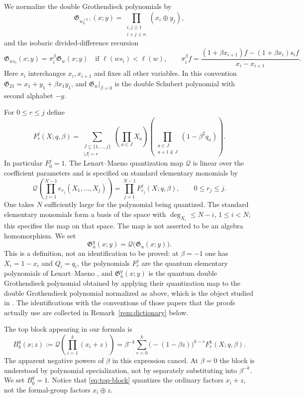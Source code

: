 \documentclass[11pt]{article}
\newcommand{\G}{\mathfrak{G}}
\newcommand{\Q}{\mathcal{Q}}
\newcommand{\ellength}{\ell}
\begin{document}
We normalize the double Grothendieck polynomials by
\[
 \G_{w_0^{(n)}}(x;y)
   =\prod_{\substack{i,j\geq 1\\i+j\leq n}}(x_i\oplus y_j),
\]
and the isobaric divided-difference recursion
\[
 \G_{ws_i}(x;y)=\pi_i^\beta\G_w(x;y)
 \quad\text{if }\ellength(ws_i)<\ellength(w),\qquad
 \pi_i^\beta f
 =\frac{(1+\beta x_{i+1})f-(1+\beta x_i)s_i f}
        {x_i-x_{i+1}}.
\]
Here $s_i$ interchanges $x_i,x_{i+1}$ and fixes all other variables.
In this convention $\G_{21}=x_1+y_1+\beta x_1y_1$, and
$\G_w|_{\beta=0}$ is the double Schubert polynomial with second
alphabet $-y$.

For $0\leq r\leq j$ define
\begin{equation}\label{eq:quantum-elementary}
 F_r^j(X;q,\beta)
 =\sum_{\substack{J\subseteq\{1,\ldots,j\}\\|J|=r}}
    \left(\prod_{a\in J}X_a\right)
    \left(\prod_{\substack{a\in J\\a+1\notin J}}
                     (1-\beta^2q_a)\right).
\end{equation}
In particular $F_0^j=1$.
The Lenart--Maeno quantization map $\Q$ is linear over the coefficient
parameters and is specified on standard elementary monomials by
\begin{equation}\label{eq:quantization}
 \Q\left(\prod_{j=1}^{N-1}e_{r_j}(X_1,\ldots,X_j)\right)
   =\prod_{j=1}^{N-1}F_{r_j}^j(X;q,\beta),
 \qquad 0\leq r_j\leq j.
\end{equation}
One takes $N$ sufficiently large for the polynomial being quantized.
The standard elementary monomials form a basis of the space with
$\deg_{X_i}\leq N-i$, $1\leq i<N$; this specifies the map on that
space. The map is not asserted to be an algebra homomorphism.
We set
\[
 \G_u^q(x;y)=\Q\bigl(\G_u(x;y)\bigr).
\]
This is a definition, not an identification to be proved: at
$\beta=-1$ one has $X_i=1-x_i$ and $Q_i=q_i$, the polynomials
$F^j_r$ are the quantum elementary polynomials of Lenart--Maeno
\cite{lenart2006quantum}, and $\G^q_u(x;y)$ is the quantum double
Grothendieck polynomial obtained by applying their quantization map to
the double Grothendieck polynomial normalized as above, which is the
object studied in \cite{naito2024pieri,maeno2024presentation2}. The
identifications with the conventions of those papers that the proofs
actually use are collected in Remark~\ref{rem:dictionary} below.

The top block appearing in our formula is
\begin{equation}\label{eq:top-block}
 B_k^q(x;z)
 :=\Q\left(\prod_{i=1}^{k}(x_i+z)\right)
 =\beta^{-k}\sum_{r=0}^{k}
       \bigl(-(1-\beta z)\bigr)^{k-r}F_r^k(X;q,\beta).
\end{equation}
The apparent negative powers of $\beta$ in this expression cancel.
At $\beta=0$ the block is understood by polynomial specialization,
not by separately substituting into $\beta^{-k}$.
We set $B_0^q=1$.
Notice that \eqref{eq:top-block} quantizes the ordinary factors
$x_i+z$, not the formal-group factors $x_i\oplus z$.
\end{document}
